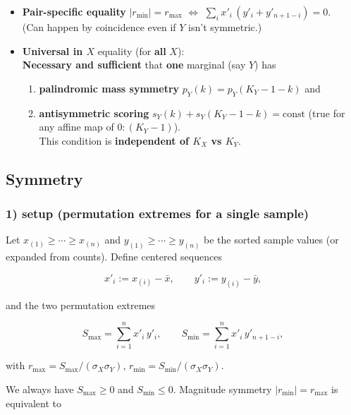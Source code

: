 \documentclass[
  letterpaper,
  DIV=11,
  numbers=noendperiod]{scrartcl}
\providecommand{\tightlist}{%
  \setlength{\itemsep}{0pt}\setlength{\parskip}{0pt}}
\theoremstyle{remark}
\begin{document}
\begin{itemize}
\item
  \textbf{Pair-specific equality} \(|r_{\min}|=r_{\max}\) \(\iff\)
  \(\sum_i x'_i\,(y'_i+y'_{n+1-i})=0\).\\
  (Can happen by coincidence even if \(Y\) isn't symmetric.)
\item
  \textbf{Universal in \(X\)} equality (for \textbf{all} \(X\)):\\
  \textbf{Necessary and sufficient} that \textbf{one} marginal (say
  \(Y\)) has

  \begin{enumerate}
  \def\labelenumi{(\roman{enumi})}
  \tightlist
  \item
    \textbf{palindromic mass symmetry} \(p_Y(k)=p_Y(K_Y-1-k)\) and\\
  \item
    \textbf{antisymmetric scoring} \(s_Y(k)+s_Y(K_Y-1-k)=\text{const}\)
    (true for any affine map of \(0{:}(K_Y-1)\)).\\
    This condition is \textbf{independent of \(K_X\) vs \(K_Y\)}.
  \end{enumerate}
\end{itemize}

\subsection{Symmetry}\label{symmetry}

\subsubsection{1) setup (permutation extremes for a single
sample)}\label{setup-permutation-extremes-for-a-single-sample}

Let \(x_{(1)}\ge\cdots\ge x_{(n)}\) and \(y_{(1)}\ge\cdots\ge y_{(n)}\)
be the sorted sample values (or expanded from counts). Define centered
sequences

\[x'_i:=x_{(i)}-\bar x,\qquad y'_i:=y_{(i)}-\bar y,\]

and the two permutation extremes

\[S_{\max}=\sum_{i=1}^n x'_i\,y'_i,\qquad  
S_{\min}=\sum_{i=1}^n x'_i\,y'_{n+1-i},\]

with \(r_{\max}=S_{\max}/(\sigma_X\sigma_Y)\),
\(r_{\min}=S_{\min}/(\sigma_X\sigma_Y)\).

We always have \(S_{\max}\ge 0\) and \(S_{\min}\le 0\). Magnitude
symmetry \(|r_{\min}|=r_{\max}\) is equivalent to
\end{document}

